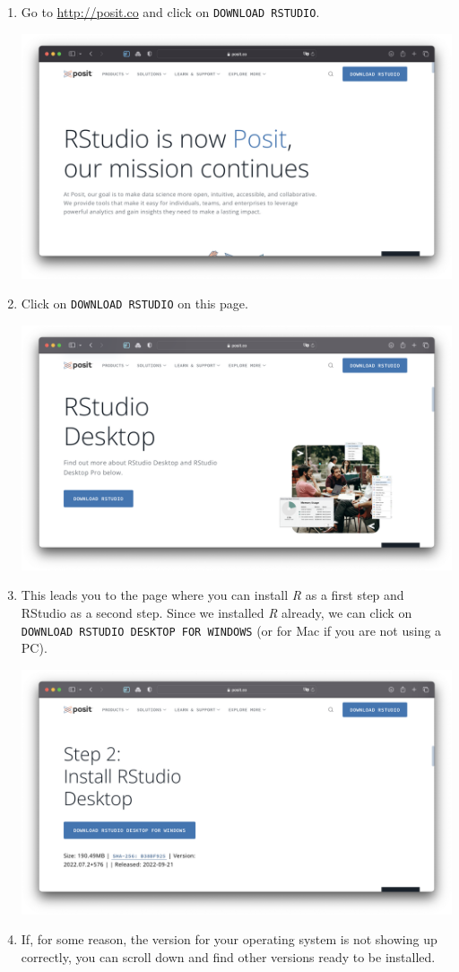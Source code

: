 \documentclass[
  letterpaper,
  DIV=11,
  numbers=noendperiod]{scrreprt}
\begin{document}
\begin{enumerate}
\def\labelenumi{\arabic{enumi}.}
\item
  Go to \url{http://posit.co} and click on \texttt{DOWNLOAD\ RSTUDIO}.

  \includegraphics{images/chapter_03_img/rstudio/01_posit_main_page.png}
\item
  Click on \texttt{DOWNLOAD\ RSTUDIO} on this page.

  \includegraphics{images/chapter_03_img/rstudio/02_posit_rstudio_desktop.png}
\item
  This leads you to the page where you can install \emph{R} as a first
  step and RStudio as a second step. Since we installed \emph{R}
  already, we can click on
  \texttt{DOWNLOAD\ RSTUDIO\ DESKTOP\ FOR\ WINDOWS} (or for Mac if you
  are not using a PC).

  \includegraphics{images/chapter_03_img/rstudio/03_posit_installer.png}
\item
  If, for some reason, the version for your operating system is not
  showing up correctly, you can scroll down and find other versions
  ready to be installed.


\end{enumerate}
\end{document}
